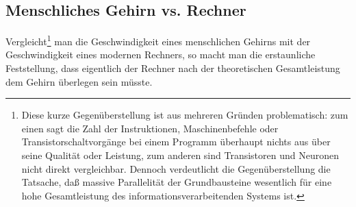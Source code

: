 \subsection{Menschliches Gehirn vs. Rechner}
Vergleicht\footnote{Diese kurze Gegenüberstellung ist aus mehreren Gründen problematisch: zum
einen sagt die Zahl der Instruktionen, Maschinenbefehle oder
Transistorschaltvorgänge bei einem Programm überhaupt nichts aus über seine
Qualität oder Leistung, zum anderen sind Transistoren und Neuronen nicht direkt
vergleichbar. Dennoch verdeutlicht die Gegenüberstellung die Tatsache, daß
massive Parallelität der Grundbausteine wesentlich für eine hohe Gesamtleistung
des informationsverarbeitenden Systems ist.} man die Geschwindigkeit eines menschlichen Gehirns mit der
Geschwindigkeit eines modernen Rechners, so macht man die erstaunliche
Feststellung, dass eigentlich der Rechner nach der theoretischen Gesamtleistung
dem Gehirn überlegen sein müsste. 

